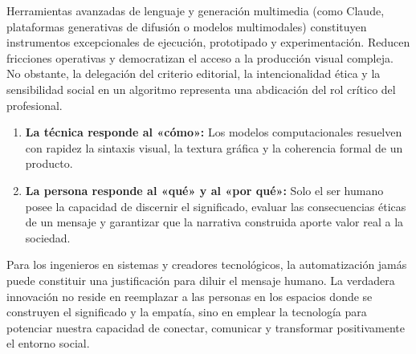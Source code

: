 Herramientas avanzadas de lenguaje y generación multimedia (como Claude, plataformas generativas de difusión o modelos multimodales) constituyen instrumentos excepcionales de ejecución, prototipado y experimentación. Reducen fricciones operativas y democratizan el acceso a la producción visual compleja. No obstante, la delegación del criterio editorial, la intencionalidad ética y la sensibilidad social en un algoritmo representa una abdicación del rol crítico del profesional.

\begin{enumerate}
  \item \textbf{La técnica responde al «cómo»:} Los modelos computacionales resuelven con rapidez la sintaxis visual, la textura gráfica y la coherencia formal de un producto.
  \item \textbf{La persona responde al «qué» y al «por qué»:} Solo el ser humano posee la capacidad de discernir el significado, evaluar las consecuencias éticas de un mensaje y garantizar que la narrativa construida aporte valor real a la sociedad.
\end{enumerate}

Para los ingenieros en sistemas y creadores tecnológicos, la automatización jamás puede constituir una justificación para diluir el mensaje humano. La verdadera innovación no reside en reemplazar a las personas en los espacios donde se construyen el significado y la empatía, sino en emplear la tecnología para potenciar nuestra capacidad de conectar, comunicar y transformar positivamente el entorno social.
